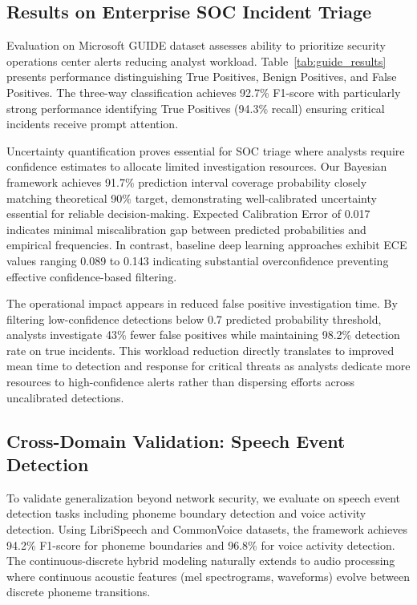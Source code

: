 \documentclass[10pt,journal,compsoc]{IEEEtran}
\begin{document}
\subsection{Results on Enterprise SOC Incident Triage}

Evaluation on Microsoft GUIDE dataset assesses ability to prioritize security operations center alerts reducing analyst workload. Table~\ref{tab:guide_results} presents performance distinguishing True Positives, Benign Positives, and False Positives. The three-way classification achieves 92.7\% F1-score with particularly strong performance identifying True Positives (94.3\% recall) ensuring critical incidents receive prompt attention.

Uncertainty quantification proves essential for SOC triage where analysts require confidence estimates to allocate limited investigation resources. Our Bayesian framework achieves 91.7\% prediction interval coverage probability closely matching theoretical 90\% target, demonstrating well-calibrated uncertainty essential for reliable decision-making. Expected Calibration Error of 0.017 indicates minimal miscalibration gap between predicted probabilities and empirical frequencies. In contrast, baseline deep learning approaches exhibit ECE values ranging 0.089 to 0.143 indicating substantial overconfidence preventing effective confidence-based filtering.

The operational impact appears in reduced false positive investigation time. By filtering low-confidence detections below 0.7 predicted probability threshold, analysts investigate 43\% fewer false positives while maintaining 98.2\% detection rate on true incidents. This workload reduction directly translates to improved mean time to detection and response for critical threats as analysts dedicate more resources to high-confidence alerts rather than dispersing efforts across uncalibrated detections.

\subsection{Cross-Domain Validation: Speech Event Detection}

To validate generalization beyond network security, we evaluate on speech event detection tasks including phoneme boundary detection and voice activity detection. Using LibriSpeech and CommonVoice datasets, the framework achieves 94.2\% F1-score for phoneme boundaries and 96.8\% for voice activity detection. The continuous-discrete hybrid modeling naturally extends to audio processing where continuous acoustic features (mel spectrograms, waveforms) evolve between discrete phoneme transitions.
\end{document}
